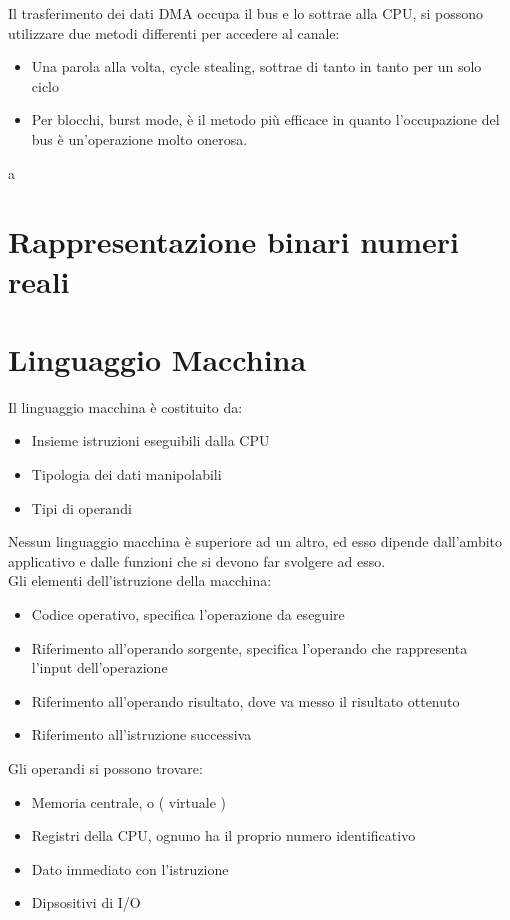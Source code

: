 \documentclass[arch.tex]{subfiles}
\begin{document}
Il trasferimento dei dati DMA occupa il bus e lo sottrae alla CPU, si possono
utilizzare due metodi differenti per accedere al canale:

\begin{itemize}
	\item Una parola alla volta, cycle stealing, sottrae di tanto in tanto
		per un solo ciclo
	\item Per blocchi, burst mode, è il metodo più efficace in quanto 
		l'occupazione del bus è un'operazione molto onerosa.
\end{itemize}
a

\section{Rappresentazione binari numeri reali}

\section{Linguaggio Macchina}%
\label{sub:linguaggio_macchina}

Il linguaggio macchina è costituito da:
\begin{itemize}
	\item Insieme istruzioni eseguibili dalla CPU
	\item Tipologia dei dati manipolabili
	\item Tipi di operandi
\end{itemize}
Nessun linguaggio macchina è superiore ad un altro, ed esso dipende dall'ambito
applicativo e dalle funzioni che si devono far svolgere ad esso.\\
Gli elementi dell'istruzione della macchina:

\begin{itemize}
	\item Codice operativo, specifica l'operazione da eseguire
	\item Riferimento all'operando sorgente, specifica l'operando che 
		rappresenta l'input dell'operazione
	\item Riferimento all'operando risultato, dove va messo
		il risultato ottenuto
	\item Riferimento all'istruzione successiva
\end{itemize}

Gli operandi si possono trovare:

\begin{itemize}
	\item Memoria centrale, o ( virtuale ) 
	\item Registri della CPU, ognuno ha il proprio numero identificativo
	\item Dato immediato con l'istruzione
	\item Dipsositivi di I/O 
\end{itemize}
\end{document}
